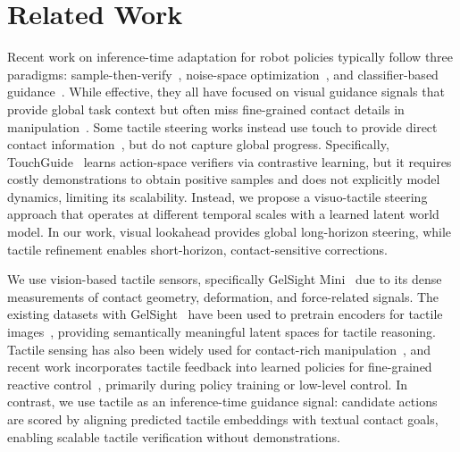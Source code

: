\section{Related Work}

Recent work on inference-time adaptation for robot policies typically follow three paradigms: sample-then-verify~\cite{wu2025foresight,kwok2025robomonkey,hansteer2026,yuan2026actasklearnuncertaintyaware}, noise-space optimization~\cite{wagenmaker2025steering}, and classifier-based guidance~\cite{sun2026latent,du2025dynaguidesteeringdiffusionpolices,wang2024inference}. While effective, they all have focused on visual guidance signals that provide global task context but often miss fine-grained contact details in manipulation~\cite{zhang2026touchguide,xue2025reactive,higuera2026visuo,cui2026vitacman}. Some tactile steering works instead use touch to provide direct contact information~\cite{tian2019manipulation,zhang2026touchguide}, but do not capture global progress. Specifically, TouchGuide~\cite{zhang2026touchguide} learns action-space verifiers via contrastive learning, but it requires costly demonstrations to obtain positive samples and does not explicitly model dynamics, limiting its scalability.
Instead, we propose a visuo-tactile steering approach that operates at different temporal scales with a learned latent world model. In our work, visual lookahead provides global long-horizon steering, while tactile refinement enables short-horizon, contact-sensitive corrections.




We use vision-based tactile sensors, specifically GelSight Mini~\cite{yuan2017gelsight} due to its dense measurements of contact geometry, deformation, and force-related signals. The existing datasets with GelSight~\cite{yuan2017gelsight,yuan2015measurement,helmut2025learning} have been used to pretrain encoders for tactile images~\cite{fenganytouch,fenganytouch2,higuerasparsh,higuera2025tactile,xie2026universal}, providing semantically meaningful latent spaces for tactile reasoning. Tactile sensing has also been widely used for contact-rich manipulation~\cite{pmlr-v78-calandra17a,calandra2018more,lee2019making,chen2023visuo, zhu2025touch}, and recent work incorporates tactile feedback into learned policies for fine-grained reactive control~\cite{huang20253d,heng2025vitacformerlearningcrossmodalrepresentation,xue2025reactive,chen2026multimodal}, primarily during policy training or low-level control. In contrast, we use tactile as an inference-time guidance signal: candidate actions are scored by aligning predicted tactile embeddings with textual contact goals, enabling scalable tactile verification without demonstrations.





